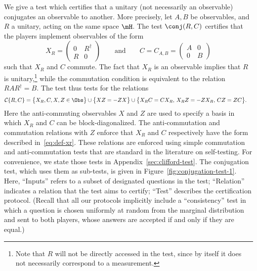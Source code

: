 We give a test which certifies that a unitary (not necessarily an observable) conjugates an observable to another. More precisely, let $A,B$ be observables, and $R$ a unitary, acting on the same space $\mH$. The test $\conj(R,C)$ certifies that the players implement observables of the form
\begin{equation}\label{eq:def-xr}
X_R = \begin{pmatrix} 0 & R^\dagger\\ R & 0 \end{pmatrix}\qquad \text{and}\qquad C = C_{A,B} = \begin{pmatrix} A & 0\\ 0 & B \end{pmatrix}
\end{equation}
such that $X_R$ and $C$ commute. The fact that $X_R$ is an observable implies that $R$ is unitary,\footnote{Note that $R$ will not be directly accessed in the test, since by itself it does not necessarily correspond to a measurement.} while the commutation condition is equivalent to the relation $RAR^\dagger = B$. The test thus tests for the relations
\begin{align*}
 \mathcal{C}\{R,C\} &= \big\{ X_R,C,X,Z\in \Obs\big\} \cup \big\{XZ=-ZX\big\}
\cup \big\{ X_R C = C X_R,\, X_RZ=-Z X_R,\, C Z=ZC\big\}.
\end{align*}
Here the anti-commuting observables $X$ and $Z$ are used to specify a basis in which $X_R$ and $C$ can be block-diagonalized. The anti-commutation and commutation relations with $Z$ enforce that $X_R$ and $C$ respectively have the form described in~\eqref{eq:def-xr}.
These relations are enforced using simple commutation and anti-commutation tests that are standard in the literature on self-testing. For convenience, we state those tests in Appendix~\ref{sec:clifford-test}. The conjugation test, which uses them as sub-tests, is given in Figure~\ref{fig:conjugation-test-1}. Here, ``Inputs'' refers to a subset of designated questions in the test; ``Relation'' indicates a relation that the test aims to certify; ``Test'' describes the certification protocol. (Recall that all our protocols implicitly include a ``consistency'' test in which a question is chosen uniformly at random from the marginal distribution and sent to both players, whose answers are accepted if and only if they are equal.)

